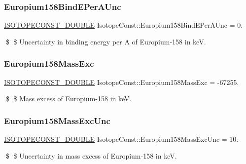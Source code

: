 \subsubsection{\texorpdfstring{Europium158\+Bind\+E\+Per\+A\+Unc}{Europium158BindEPerAUnc}}
{\footnotesize\ttfamily \mbox{\hyperlink{group___isotope_const-_macros_ga8f45a7272ce02c0b4c65c44636ed719a}{I\+S\+O\+T\+O\+P\+E\+C\+O\+N\+S\+T\+\_\+\+D\+O\+U\+B\+LE}} Isotope\+Const\+::\+Europium158\+Bind\+E\+Per\+A\+Unc = 0.}

\$ \$ Uncertainty in binding energy per A of Europium-\/158 in keV. \mbox{\label{group___isotope_const-_europium-_eu158_ga0a4d20e57d2dc6b0591bc57d1a65ed2f}} 
\subsubsection{\texorpdfstring{Europium158\+Mass\+Exc}{Europium158MassExc}}
{\footnotesize\ttfamily \mbox{\hyperlink{group___isotope_const-_macros_ga8f45a7272ce02c0b4c65c44636ed719a}{I\+S\+O\+T\+O\+P\+E\+C\+O\+N\+S\+T\+\_\+\+D\+O\+U\+B\+LE}} Isotope\+Const\+::\+Europium158\+Mass\+Exc = -\/67255.}

\$ \$ Mass excess of Europium-\/158 in keV. \mbox{\label{group___isotope_const-_europium-_eu158_ga3dc51ea0cb11f24870e86bb302a0e865}} 
\subsubsection{\texorpdfstring{Europium158\+Mass\+Exc\+Unc}{Europium158MassExcUnc}}
{\footnotesize\ttfamily \mbox{\hyperlink{group___isotope_const-_macros_ga8f45a7272ce02c0b4c65c44636ed719a}{I\+S\+O\+T\+O\+P\+E\+C\+O\+N\+S\+T\+\_\+\+D\+O\+U\+B\+LE}} Isotope\+Const\+::\+Europium158\+Mass\+Exc\+Unc = 10.}

\$ \$ Uncertainty in mass excess of Europium-\/158 in keV. \mbox{\label{group___isotope_const-_europium-_eu158_ga6811c256637b783f157a59e072bb4b2d}} 
